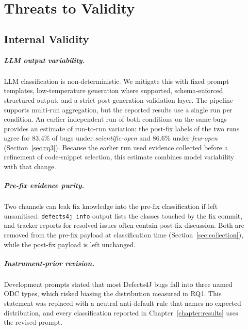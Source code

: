 \documentclass{iutbscthesis}
\begin{document}
\chapter{Threats to Validity} \label{chapter:threats}

\section{Internal Validity}

\paragraph{LLM output variability.} LLM classification is non-deterministic. We mitigate this with fixed prompt templates, low-temperature generation where supported, schema-enforced structured output, and a strict post-generation validation layer. The pipeline supports multi-run aggregation, but the reported results use a single run per condition. An earlier independent run of both conditions on the same bugs provides an estimate of run-to-run variation: the post-fix labels of the two runs agree for 83.4\% of bugs under \textit{scientific-open} and 86.6\% under \textit{few-open} (Section~\ref{sec:rq3}). Because the earlier run used evidence collected before a refinement of code-snippet selection, this estimate combines model variability with that change.

\paragraph{Pre-fix evidence purity.} Two channels can leak fix knowledge into the pre-fix classification if left unsanitised: \texttt{defects4j info} output lists the classes touched by the fix commit, and tracker reports for resolved issues often contain post-fix discussion. Both are removed from the pre-fix payload at classification time (Section~\ref{sec:collection}), while the post-fix payload is left unchanged.

\paragraph{Instrument-prior revision.} Development prompts stated that most Defects4J bugs fall into three named ODC types, which risked biasing the distribution measured in RQ1. This statement was replaced with a neutral anti-default rule that names no expected distribution, and every classification reported in Chapter~\ref{chapter:results} uses the revised prompt.
\end{document}
